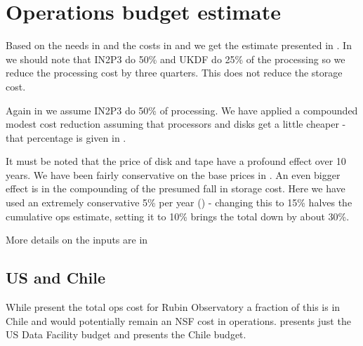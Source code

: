 \section{Operations budget estimate}\label{sec:opscost}
Based on the needs in  and the costs in  and 
we get the estimate presented in .
In  we should note that IN2P3 do 50\%  and UKDF do 25\% of the processing so we reduce the processing cost by three quarters.
This does not reduce the storage cost.



Again in  we assume IN2P3 do 50\% of processing.
We have applied a compounded modest cost reduction assuming that processors  and disks get a little cheaper - that
percentage is given in .

It must be noted that the price of disk and tape have a profound effect over 10 years. We have been fairly conservative on the base prices
in . An even bigger effect is in the compounding of the presumed fall in storage cost. Here we have used an extremely
conservative 5\% per year () - changing this to 15\% halves the cumulative ops estimate, setting it to 10\% brings the
total down by about 30\%.


More details on the inputs are in 

\subsection{US and Chile}
While  present the total ops cost for Rubin Observatory a fraction of this is in Chile and would potentially remain an NSF cost in operations.  presents just the US Data Facility budget  and
 presents the Chile budget.




